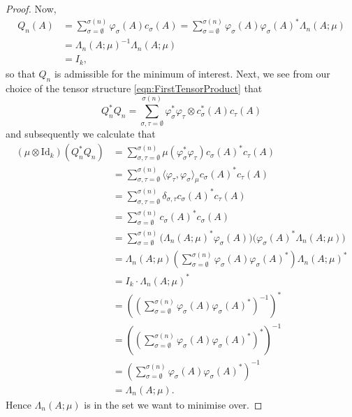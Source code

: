 \documentclass[11pt,reqno]{amsart}
\def\p{\varphi}
\def\s{\sigma}
\def\t{\tau}
\def\d{\delta}
\def\L{\Lambda}
\theoremstyle{definition}
\numberwithin{equation}{section}
\begin{document}
\begin{proof}
    Now,
    \begin{align*}
        Q_n(A) & = \sum_{\s = \emptyset}^{\s(n)} \p_\s(A) c_\s(A) = \sum_{\s = \emptyset}^{\s(n)} \p_\s(A) \p_\s(A)^*\L_{n}(A; \mu) \\
        & = \L_{n}(A; \mu)^{-1} \L_{n}(A; \mu) \\
        & = I_k,
    \end{align*}
    so that \(Q_n\) is admissible for the minimum of interest. Next, we see from our choice of the tensor structure \eqref{eqn:FirstTensorProduct} that
    \[
        Q_n^* Q_n = \sum_{\s,\t = \emptyset}^{\s(n)} \p_\s^*\p_\t \otimes c_\s^*(A)c_\t(A)
    \]
    and subsequently we calculate that
    \begin{align*}
        (\mu \otimes \mathrm{Id}_k)(Q_n^* Q_n) & = \sum_{\s,\t = \emptyset}^{\s(n)} \mu(\p_\s^* \p_\t)c_\s(A)^*c_\t(A) \\
        & = \sum_{\s,\t = \emptyset}^{\s(n)} \langle \p_\t, \p_\s \rangle_\mu c_\s(A)^*c_\t(A) \\
        & = \sum_{\s,\t = \emptyset}^{\s(n)} \d_{\s,\t} c_\s(A)^* c_\t(A) \\
        & = \sum_{\s = \emptyset}^{\s(n)} c_\s(A)^* c_\s(A) \\
        & = \sum_{\s = \emptyset}^{\s(n)} \big( \L_{n}(A; \mu)^* \p_\s(A)\big) \big( \p_\s(A)^*\L_{n}(A; \mu)\big) \\
        & = \L_{n}(A; \mu) \left(\sum_{\s = \emptyset}^{\s(n)} \p_\s(A)\p_\s(A)^*\right) \L_{n}(A; \mu)^* \\
        & = I_k \cdot \L_{n}(A; \mu)^* \\
        & = \left(\left(\sum_{\s = \emptyset}^{\s(n)} \p_\s(A)\p_\s(A)^*\right)^{-1}\right)^* \\
        & = \left(\left(\sum_{\s = \emptyset}^{\s(n)} \p_\s(A)\p_\s(A)^*\right)^{*}\right)^{-1} \\
        & = \left(\sum_{\s = \emptyset}^{\s(n)} \p_\s(A)\p_\s(A)^*\right)^{-1} \\
        & = \L_{n}(A; \mu).
    \end{align*}
    Hence \(\L_{n}(A; \mu)\) is in the set we want to minimise over.


\end{proof}
\end{document}
